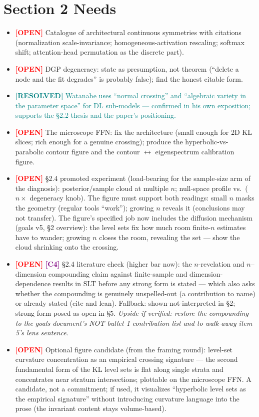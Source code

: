 \documentclass[11pt]{article}
\newcommand{\resolved}[1]{\textcolor{teal}{\textbf{[RESOLVED]} #1}}
\newcommand{\open}{\textcolor{red}{\textbf{[OPEN]}} }
\newcommand{\cref}[1]{\textcolor{purple}{\textbf{[#1]}} }
\begin{document}
\section{Section 2 Needs}

\begin{itemize}[itemsep=4pt]
\item \open Catalogue of architectural continuous symmetries with
citations (normalization scale-invariance; homogeneous-activation
rescaling; softmax shift; attention-head permutation as the discrete
part).
\item \open DGP degeneracy: state as presumption, not theorem
(``delete a node and the fit degrades'' is probably false); find the
honest citable form.
\item \resolved{Watanabe uses ``normal crossing'' and ``algebraic
variety in the parameter space'' for DL sub-models --- confirmed in his
own exposition; supports the \S2.2 thesis and the paper's positioning.}
\item \open The microscope FFN: fix the architecture (small enough for
2D KL slices; rich enough for a genuine crossing); produce the
hyperbolic-vs-parabolic contour figure and the contour
$\leftrightarrow$ eigenspectrum calibration figure.
\item \open \S2.4 promoted experiment (load-bearing for the sample-size
arm of the diagnosis): posterior/sample cloud at multiple $n$;
null-space profile vs.\ ($n \times$ degeneracy knob). The figure must
support both readings: small $n$ masks the geometry (regular tools
``work''); growing $n$ reveals it (conclusions may not transfer). The
figure's specified job now includes the diffusion mechanism (goals v5,
\S2 overview): the level sets fix how much room finite-$n$ estimates
have to wander; growing $n$ closes the room, revealing the set --- show
the cloud shrinking onto the crossing.
\item \open \cref{C4} \S2.4 literature check (higher bar now): the
$n$-revelation and $n$--dimension compounding claim against
finite-sample and dimension-dependence results in SLT before any strong
form is stated --- which also asks whether the compounding is genuinely
unspelled-out (a contribution to name) or already stated (cite and
lean). Fallback: shown-not-interpreted in \S2; strong form posed as
open in \S5. \emph{Upside if verified: restore the compounding to the
goals document's NOT bullet 1 contribution list and to walk-away item
5's lens sentence.}
\item \open Optional figure candidate (from the framing round): level-set
curvature concentration as an empirical crossing signature --- the
second fundamental form of the KL level sets is flat along single strata
and concentrates near stratum intersections; plottable on the microscope
FFN. A candidate, not a commitment; if used, it visualizes ``hyperbolic
level sets as the empirical signature'' without introducing curvature
language into the prose (the invariant content stays volume-based).
\end{itemize}
\end{document}
